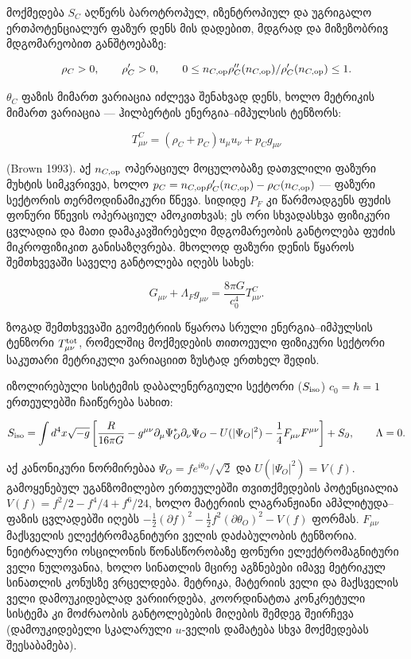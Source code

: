 \documentclass[11pt,a4paper]{article}
\begin{document}
მოქმედება $S_C$ აღწერს ბაროტროპულ, იზენტროპიულ და უგრიგალო ერთპოტენციალურ ფაზურ დენს მის დადებით, მდგრად და მიზეზობრივ მდგომარეობით განშტოებაზე:

\[
\rho_C>0,\qquad \rho_C'>0,\qquad
0\le n_{C,{\rm op}}\rho_C''(n_{C,{\rm op}})/\rho_C'(n_{C,{\rm op}})\le1.
\]

$\theta_C$ ფაზის მიმართ ვარიაცია იძლევა შენახვად დენს, ხოლო მეტრიკის მიმართ ვარიაცია — ჰილბერტის ენერგია–იმპულსის ტენზორს:

\[
T^C_{\mu\nu}=(\rho_C+p_C)u_\mu u_\nu+p_Cg_{\mu\nu}
\]

(Brown 1993). აქ $n_{C,{\rm op}}$ ოპერაციულ მოცულობაზე დათვლილი ფაზური მუხტის სიმკვრივეა, ხოლო $p_C=n_{C,{\rm op}}\rho_C'(n_{C,{\rm op}})-\rho_C(n_{C,{\rm op}})$ — ფაზური სექტორის თერმოდინამიკური წნევა. სიდიდე $P_F$ კი წარმოადგენს ფუძის ფონური წნევის ოპერაციულ ამოკითხვას; ეს ორი სხვადასხვა ფიზიკური ცვლადია და მათი დამაკავშირებელი მდგომარეობის განტოლება ფუძის მიკროფიზიკით განისაზღვრება. მხოლოდ ფაზური დენის წყაროს შემთხვევაში საველე განტოლება იღებს სახეს:

\[
G_{\mu\nu}+\Lambda_Fg_{\mu\nu}=\frac{8\pi G}{c_0^4}T^C_{\mu\nu}.
\]

ზოგად შემთხვევაში გეომეტრიის წყაროა სრული ენერგია–იმპულსის ტენზორი $T^{\rm tot}_{\mu\nu}$, რომელშიც მოქმედების თითოეული ფიზიკური სექტორი საკუთარი მეტრიკული ვარიაციით ზუსტად ერთხელ შედის.

იზოლირებული სისტემის დაბალენერგიული სექტორი ($S_{\rm iso}$) $c_0=\hbar=1$ ერთეულებში ჩაიწერება სახით:

\[
S_{\rm iso}=\int d^4x\sqrt{-g}\left[
\frac{R}{16\pi G}
-g^{\mu\nu}\partial_\mu\Psi_O^*\partial_\nu\Psi_O
-U(|\Psi_O|^2)-\frac14F_{\mu\nu}F^{\mu\nu}
\right]+S_{\partial},\qquad \Lambda=0.
\]

აქ კანონიკური ნორმირებაა $\Psi_O=f e^{i\theta_O}/\sqrt2$ და $U(|\Psi_O|^2)=V(f)$. გამოყენებულ უგანზომილებო ერთეულებში თვითქმედების პოტენციალია $V(f)=f^2/2-f^4/4+f^6/24$, ხოლო მატერიის ლაგრანჟიანი ამპლიტუდა–ფაზის ცვლადებში იღებს $-\tfrac12(\partial f)^2-\tfrac12f^2(\partial\theta_O)^2-V(f)$ ფორმას. $F_{\mu\nu}$ მაქსველის ელექტრომაგნიტური ველის დაძაბულობის ტენზორია. ნეიტრალური ოსცილონის წონასწორობაზე ფონური ელექტრომაგნიტური ველი ნულოვანია, ხოლო სინათლის მცირე აგზნებები იმავე მეტრიკულ სინათლის კონუსზე ვრცელდება. მეტრიკა, მატერიის ველი და მაქსველის ველი დამოუკიდებლად ვარიირდება, კოორდინატთა კონკრეტული სისტემა კი მოძრაობის განტოლებების მიღების შემდეგ შეირჩევა (დამოუკიდებელი სკალარული $u$-ველის დამატება სხვა მოქმედებას შეესაბამება).
\end{document}
